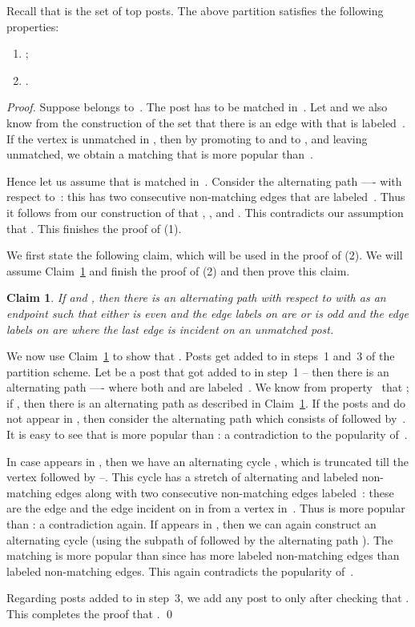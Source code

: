 \documentclass[11pt]{llncs}
\newtheorem{new-claim}{Claim}
\begin{document}
\begin{lemma}
\label{lemma-F} 
Recall that  is the set of top posts. The above partition  satisfies the following properties:
\begin{enumerate}[1.]
\item ;
\item .
\end{enumerate}
\end{lemma}
\begin{proof}
Suppose  belongs to~. The post  has to be matched 
in~. Let  and we also know from the construction of the set  that 
there is an edge  with  that is labeled~. If the vertex  is 
unmatched in , then by promoting  to  and  to , 
and leaving  unmatched, we obtain a matching that is more popular than~.

Hence let us assume that  is matched in~. Consider the alternating path 
---- with respect to~: this has two consecutive non-matching 
edges that are labeled~. Thus it follows from our construction of  that 
, , and . 
This contradicts our assumption that . This finishes the proof of (1).

\smallskip

We first state the following claim, which will be used in the proof of (2). We will assume Claim~\ref{lem:alt-path}
and finish the proof of (2) and then prove this claim.
\begin{new-claim}
\label{lem:alt-path}
If  and , then there is an alternating path  with respect to  
with  as an endpoint such that either  is even and  the edge labels on  
are  or  is odd and the edge labels on  are 
 where the last edge is incident on an unmatched post.
\end{new-claim}


We now use Claim~\ref{lem:alt-path} to show that .
Posts get added to  in steps~1 and~3 of the partition scheme. 
Let  be a post that got added to  in step~1 -- then there is an alternating path 
---- where both  and  are labeled~. 
We know from property~ that ; if , then there is 
an alternating path  as described in Claim~\ref{lem:alt-path}. If the posts  and 
 do not appear in , then 
consider the alternating path  which consists of  followed by~. It is easy 
to see that  is more popular than : a contradiction to the popularity of~. 

In case  appears in , then we have an alternating cycle , which is  
truncated till the vertex  followed by --. This cycle has a stretch of 
alternating  and  labeled non-matching edges along with two consecutive non-matching 
edges labeled~: these are the edge  and the edge incident on  in  from a vertex 
in~. Thus  is more popular than : a contradiction again. If  
appears in  , then we can again construct an alternating cycle  
(using the  subpath of  followed by the alternating path ).
The matching  is more popular than  since  
has more  labeled non-matching edges than  labeled non-matching edges. This again
contradicts the popularity of~.


Regarding posts added to  in step~3, we add any post  to  only after checking that 
. This completes the proof that . \qed
\end{proof}
\end{document}
